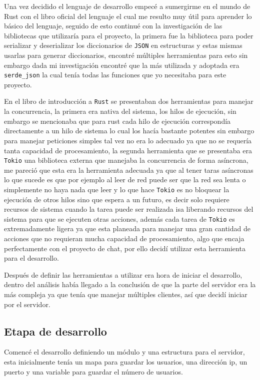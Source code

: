 \documentclass[12pt, titlepage]{article}
\begin{document}
Una vez decidido el lenguaje de desarrollo empecé a sumergirme en el mundo de Rust con el libro oficial del lenguaje el cual me resulto muy útil para aprender lo básico del lenguaje, seguido de esto continué con la investigación de las bibliotecas que utilizaría para el proyecto, la primera fue la biblioteca para poder serializar y deserializar los diccionarios de \lstinline|JSON| en estructuras y estas mismas usarlas para generar diccionarios, encontré múltiples herramientas para esto sin embargo dada mi investigación encontré que la más utilizada y adoptada era \lstinline|serde_json| la cual tenía todas las funciones que yo necesitaba para este proyecto.

En el libro de introducción a \lstinline|Rust| se presentaban dos herramientas para manejar la concurrencia, la primera era nativa del sistema, los hilos de ejecución, sin embargo se mencionaba que para rust cada hilo de ejecución correspondía directamente a un hilo de sistema lo cual los hacía bastante potentes sin embargo para manejar peticiones simples tal vez no era lo adecuado ya que no se requería tanta capacidad de procesamiento, la segunda herramienta que se presentaba era \lstinline|Tokio| una biblioteca externa que manejaba la concurrencia de forma asíncrona, me pareció que esta era la herramienta adecuada ya que al tener taras asíncronas lo que sucede es que por ejemplo al leer de red puede ser que la red sea lenta o simplemente no haya nada que leer y lo que hace \lstinline|Tokio| es no bloquear la ejecución de otros hilos sino que espera a un futuro, es decir solo requiere recursos de sistema cuando la tarea puede ser realizada isa liberando recursos del sistema para que se ejecuten otras acciones, además cada tarea de \lstinline|Tokio| es extremadamente ligera ya que esta planeada para manejar una gran cantidad de acciones que no requieran mucha capacidad de procesamiento, algo que encaja perfectamente con el proyecto de chat, por ello decidí utilizar esta herramienta para el desarrollo.

Después de definir las herramientas a utilizar era hora de iniciar el desarrollo, dentro del análisis había llegado a la conclusión de que la parte del servidor era la más compleja ya que tenía que manejar múltiples clientes, así que decidí iniciar por el servidor.

\subsection{Etapa de desarrollo}
Comencé el desarrollo definiendo un módulo y una estructura para el servidor, esta inicialmente tenía un mapa para guardar los usuarios, una dirección ip, un puerto y una variable para guardar el número de usuarios.
\end{document}

